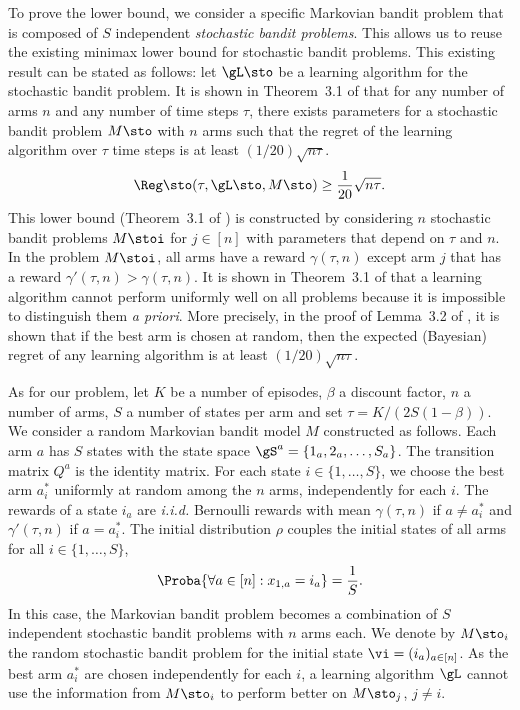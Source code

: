\begin{subappendices}
To prove the lower bound, we consider a specific Markovian bandit problem that is composed of $S$ independent \emph{stochastic bandit problems}. 
This allows us to reuse the existing minimax lower bound for stochastic bandit problems. 
This existing result can be stated as follows: let $\gL\sto$ be a learning algorithm for the stochastic bandit problem. 
It is shown in Theorem~3.1 of \cite{bubeck2012regret} that for any number of arms $n$ and any number of time steps $\tau$, there exists parameters for a stochastic bandit problem $M\sto$ with $n$ arms such that the regret of the learning algorithm over $\tau$ time steps is at least $(1/20)\sqrt{n \tau}$. 
\begin{align}
    \label{eq:regret_sto}
    \Reg\sto( \tau, \gL\sto, M\sto) \ge \frac1{20}\sqrt{n\tau}. 
\end{align}
This lower bound (Theorem~3.1 of \cite{bubeck2012regret}) is constructed by considering $n$ stochastic bandit problems $M\stoi$ for $j\in[n]$ with parameters that depend on $\tau$ and $n$. 
In the problem $M\stoi$, all arms have a reward $\gamma(\tau,n)$ except arm $j$ that has a reward $\gamma'(\tau,n)>\gamma(\tau,n)$. 
It is shown in Theorem~3.1 of \cite{bubeck2012regret} that a learning algorithm cannot perform uniformly well on all problems because it is impossible to distinguish them \emph{a priori}. 
More precisely, in the proof of Lemma~3.2 of \cite{bubeck2012regret}, it is shown that if the best arm is chosen at random, then the expected (Bayesian) regret of any learning algorithm is at least $(1/20)\sqrt{n \tau}$.

As for our problem, let $K$ be a number of episodes, $\beta$ a discount factor, $n$ a number of arms, $S$ a number of states per arm and set $\tau=K/(2S(1-\beta))$. 
We consider a random Markovian bandit model $M$ constructed as follows. 
Each arm $a$ has $S$ states with the state space $\gS^a = \{ 1_a,2_a,\ldots, S_a\}$. 
The transition matrix $Q^a$ is the identity matrix. 
For each state $i\in\{1,\dots, S\}$, we choose the best arm $a^*_i$ uniformly at random among the $n$ arms, independently for each $i$. 
The rewards of a state $i_a$ are \emph{i.i.d.} Bernoulli rewards with mean $\gamma(\tau,n)$ if $a\ne a^*_i$ and $\gamma'(\tau,n)$ if $a=a^*_i$. 
The initial distribution $\rho$ couples the initial states of all arms for all $i\in\{1,\dots, S\}$, 
\begin{align*}
    \Proba{\forall a\in[n]: x_{1,a} = i_a} = \frac1S. 
\end{align*} 
In this case, the Markovian bandit problem becomes a combination of $S$ independent stochastic bandit problems with $n$ arms each. 
We denote by $M\sto_i$ the random stochastic bandit problem for the initial state $\vi=(i_a)_{a\in[n]}$. As the best arm $a^*_i$ are chosen independently for each $i$, a learning algorithm $\gL$ cannot use the information from $M\sto_i$ to perform better on $M\sto_j$, $j\ne i$.


\end{subappendices}
